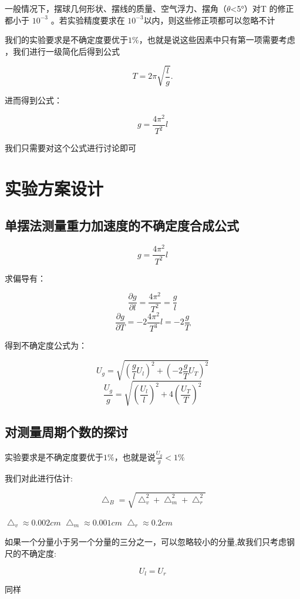 \documentclass{article}
\begin{document}
    一般情况下，摆球几何形状、摆线的质量、空气浮力、摆角（$\theta $<5°）对T 的修正都小于 $10^{-3}$
    。若实验精度要求在 $10^{-3}$以内，则这些修正项都可以忽略不计
    
    我们的实验要求是不确定度要优于$1\%$，也就是说这些因素中只有第一项需要考虑
    ，我们进行一级简化后得到公式

    \[ T=2\pi\sqrt{\frac{l}{g}}. \]

    进而得到公式：

    \[g=\frac{4\pi^{2}}{T^{2}}l\]

    我们只需要对这个公式进行讨论即可
    
\section{实验方案设计}
    \subsection{单摆法测量重力加速度的不确定度合成公式}
        \[g=\frac{4\pi^{2}}{T^{2}}l\]

        求偏导有：

        \[\frac{\partial g}{\partial l}=\frac{4\pi^{2}}{T^{2}}=\frac{g}{l}\]
        \[\frac{\partial g}{\partial T}=-2\frac{4\pi^{2}}{T^{3}}l=-2\frac{g}{T}\]

        得到不确定度公式为：

        \[U_{g}=\sqrt{(\frac{g}{l}U_{l})^2+(-2\frac{g}{T}U_{T})^2}\]
        \[\frac{U_{g}}{g}=\sqrt{(\frac{U_{l}}{l})^2+4(\frac{U_{T}}{T})^2}\]

        
    \subsection{ 对测量周期个数的探讨}

        实验要求是不确定度要优于$1\%$，也就是说$\frac{U_{g}}{g}<1\%$

        我们对此进行估计:

        \[\bigtriangleup_{B}=\sqrt{\bigtriangleup_{v}^2+\bigtriangleup_{m}^2+\bigtriangleup_{r}^2}\]

        $\bigtriangleup_{v}\approx 0.002 cm$
        $\bigtriangleup_{m}\approx 0.001 cm$
        $\bigtriangleup_{r}\approx 0.2 cm$

        如果一个分量小于另一个分量的三分之一，可以忽略较小的分量,故我们只考虑钢尺的不确定度:
        
        \[U_{l}=U_{r}\]

        同样
\end{document}
